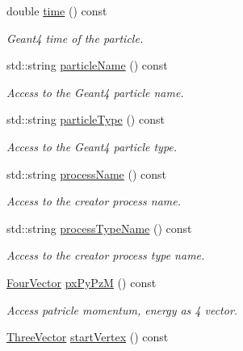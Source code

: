 \begin{DoxyCompactItemize}
double \hyperlink{class_d_d4hep_1_1_simulation_1_1_geant4_particle_handle_a3d11ffef1c5568f7849c3073042375a4}{time} () const
\begin{DoxyCompactList}\small\item\em Geant4 time of the particle. \end{DoxyCompactList}\item 
std\+::string \hyperlink{class_d_d4hep_1_1_simulation_1_1_geant4_particle_handle_aef52f9ffbf69cb4c8470a400ed6a3e00}{particle\+Name} () const
\begin{DoxyCompactList}\small\item\em Access to the Geant4 particle name. \end{DoxyCompactList}\item 
std\+::string \hyperlink{class_d_d4hep_1_1_simulation_1_1_geant4_particle_handle_af00b1991de98a7749196c9f8097f23a3}{particle\+Type} () const
\begin{DoxyCompactList}\small\item\em Access to the Geant4 particle type. \end{DoxyCompactList}\item 
std\+::string \hyperlink{class_d_d4hep_1_1_simulation_1_1_geant4_particle_handle_a4b2857a4e17df287169d0635bea3f9f9}{process\+Name} () const
\begin{DoxyCompactList}\small\item\em Access to the creator process name. \end{DoxyCompactList}\item 
std\+::string \hyperlink{class_d_d4hep_1_1_simulation_1_1_geant4_particle_handle_a3b3a0595817fe179c68030e6cac92f9b}{process\+Type\+Name} () const
\begin{DoxyCompactList}\small\item\em Access to the creator process type name. \end{DoxyCompactList}\item 
\hyperlink{class_d_d4hep_1_1_simulation_1_1_geant4_particle_handle_a79648f819b70d2f741fd1a5e19dc2f23}{Four\+Vector} \hyperlink{class_d_d4hep_1_1_simulation_1_1_geant4_particle_handle_a8611e41b19321562910d1003ad7843cc}{px\+Py\+PzM} () const
\begin{DoxyCompactList}\small\item\em Access patricle momentum, energy as 4 vector. \end{DoxyCompactList}\item 
\hyperlink{class_d_d4hep_1_1_simulation_1_1_geant4_particle_handle_a8aabe9ad3397b25aae653c42ec82021a}{Three\+Vector} \hyperlink{class_d_d4hep_1_1_simulation_1_1_geant4_particle_handle_a428ea2cb742ab56680e874ff14252215}{start\+Vertex} () const

\end{DoxyCompactItemize}
